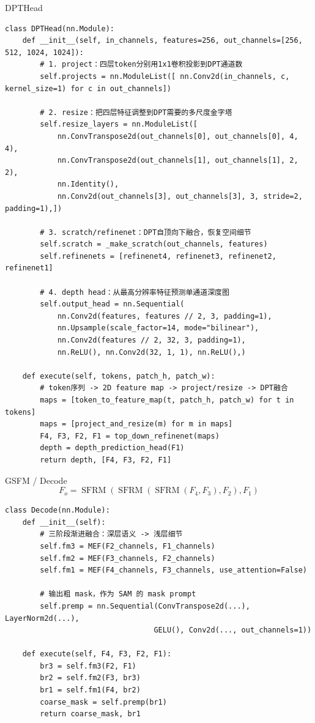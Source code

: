 \begin{frame}[fragile]{DPTHead}
\begin{lstlisting}[style=pythoncode,basicstyle=\ttfamily\tiny]
class DPTHead(nn.Module):
    def __init__(self, in_channels, features=256, out_channels=[256, 512, 1024, 1024]):
        # 1. project：四层token分别用1x1卷积投影到DPT通道数
        self.projects = nn.ModuleList([ nn.Conv2d(in_channels, c, kernel_size=1) for c in out_channels])

        # 2. resize：把四层特征调整到DPT需要的多尺度金字塔
        self.resize_layers = nn.ModuleList([
            nn.ConvTranspose2d(out_channels[0], out_channels[0], 4, 4),
            nn.ConvTranspose2d(out_channels[1], out_channels[1], 2, 2),
            nn.Identity(),
            nn.Conv2d(out_channels[3], out_channels[3], 3, stride=2, padding=1),])

        # 3. scratch/refinenet：DPT自顶向下融合，恢复空间细节
        self.scratch = _make_scratch(out_channels, features)
        self.refinenets = [refinenet4, refinenet3, refinenet2, refinenet1]

        # 4. depth head：从最高分辨率特征预测单通道深度图
        self.output_head = nn.Sequential(
            nn.Conv2d(features, features // 2, 3, padding=1),
            nn.Upsample(scale_factor=14, mode="bilinear"),
            nn.Conv2d(features // 2, 32, 3, padding=1),
            nn.ReLU(), nn.Conv2d(32, 1, 1), nn.ReLU(),)

    def execute(self, tokens, patch_h, patch_w):
        # token序列 -> 2D feature map -> project/resize -> DPT融合
        maps = [token_to_feature_map(t, patch_h, patch_w) for t in tokens]
        maps = [project_and_resize(m) for m in maps]
        F4, F3, F2, F1 = top_down_refinenet(maps)
        depth = depth_prediction_head(F1)
        return depth, [F4, F3, F2, F1]
\end{lstlisting}
\end{frame}

\begin{frame}[fragile]{GSFM / Decode}
\[
F_o = \operatorname{SFRM}(\operatorname{SFRM}(\operatorname{SFRM}(F_4,F_3),F_2),F_1)
\]
\begin{lstlisting}[style=pythoncode,basicstyle=\ttfamily\tiny]
class Decode(nn.Module):
    def __init__(self):
        # 三阶段渐进融合：深层语义 -> 浅层细节
        self.fm3 = MEF(F2_channels, F1_channels)
        self.fm2 = MEF(F3_channels, F2_channels)
        self.fm1 = MEF(F4_channels, F3_channels, use_attention=False)

        # 输出粗 mask，作为 SAM 的 mask prompt
        self.premp = nn.Sequential(ConvTranspose2d(...), LayerNorm2d(...),
                                  GELU(), Conv2d(..., out_channels=1))

    def execute(self, F4, F3, F2, F1):
        br3 = self.fm3(F2, F1)
        br2 = self.fm2(F3, br3)
        br1 = self.fm1(F4, br2)
        coarse_mask = self.premp(br1)
        return coarse_mask, br1
\end{lstlisting}
\end{frame}

